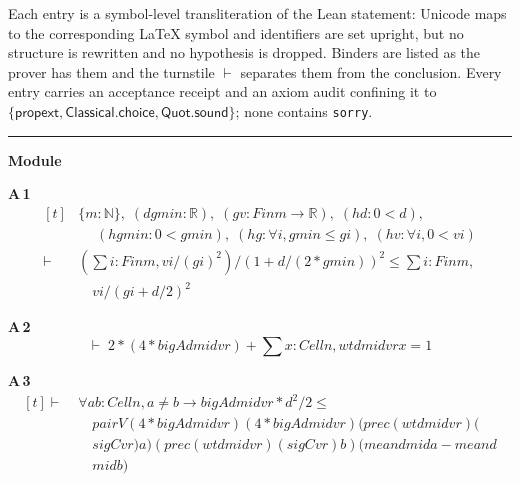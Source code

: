 Each entry is a symbol-level transliteration of the Lean statement: Unicode maps to the corresponding \LaTeX{} symbol and identifiers are set upright, but no structure is rewritten and no hypothesis is dropped. Binders are listed as the prover has them and the turnstile $\vdash$ separates them from the conclusion. Every entry carries an acceptance receipt and an axiom audit confining it to $\{\textsf{propext},\textsf{Classical.choice},\textsf{Quot.sound}\}$; none contains \texttt{sorry}.

\vspace{4pt}\noindent\rule{\columnwidth}{0.4pt}\par\vspace{2pt}
\noindent\textbf{Module }\par\vspace{3pt}

\noindent\textbf{A\,1}\quad{}
{\footnotesize\[ \begin{aligned}[t]
&\{ \mathit{m} : \mathbb{N} \},\; (\mathit{d} \mathit{gmin} : \mathbb{R} ),\; (\mathit{g} \mathit{v} : \mathit{Fin} \mathit{m} \to \mathbb{R} ),\; (\mathit{hd} : 0 < \mathit{d}),\\
&\quad \; (\mathit{hgmin} : 0 < \mathit{gmin}),\; (\mathit{hg} : \forall \mathit{i}, \mathit{gmin} \leq \mathit{g} \mathit{i}),\; (\mathit{hv} : \forall \mathit{i}, 0 < \mathit{v} \mathit{i})\\
\vdash\;&(\textstyle\sum \mathit{i} : \mathit{Fin} \mathit{m}, \mathit{v} \mathit{i} / (\mathit{g} \mathit{i}) ^{2}) / (1 + \mathit{d} / (2 * \mathit{gmin})) ^{2} \leq \textstyle\sum \mathit{i} : \mathit{Fin} \mathit{m},\\
&\quad \mathit{v} \mathit{i} / (\mathit{g} \mathit{i} + \mathit{d} / 2) ^{2}
\end{aligned} \]}

\noindent\textbf{A\,2}\quad{}
{\footnotesize\[ \vdash\; 2 * (4 * \mathit{bigA} \mathit{d} \mathit{mid} \mathit{vr}) + \textstyle\sum \mathit{x} : \mathit{Cell} \mathit{n}, \mathit{wt} \mathit{d} \mathit{mid} \mathit{vr} \mathit{x} = 1 \]}

\noindent\textbf{A\,3}\quad{}
{\footnotesize\[ \begin{aligned}[t]
\vdash\;&\forall \mathit{a} \mathit{b} : \mathit{Cell} \mathit{n}, \mathit{a} \neq \mathit{b} \to \mathit{bigA} \mathit{d} \mathit{mid} \mathit{vr} * \mathit{d} ^{2} / 2 \leq\\
&\quad \mathit{pairV} (4 * \mathit{bigA} \mathit{d} \mathit{mid} \mathit{vr}) (4 * \mathit{bigA} \mathit{d} \mathit{mid} \mathit{vr}) (\mathit{prec} (\mathit{wt} \mathit{d} \mathit{mid} \mathit{vr}) (\\
&\quad \mathit{sigC} \mathit{vr}) \mathit{a}) (\mathit{prec} (\mathit{wt} \mathit{d} \mathit{mid} \mathit{vr}) (\mathit{sigC} \mathit{vr}) \mathit{b}) (\mathit{mean} \mathit{d} \mathit{mid} \mathit{a} - \mathit{mean} \mathit{d}\\
&\quad \mathit{mid} \mathit{b})
\end{aligned} \]}

